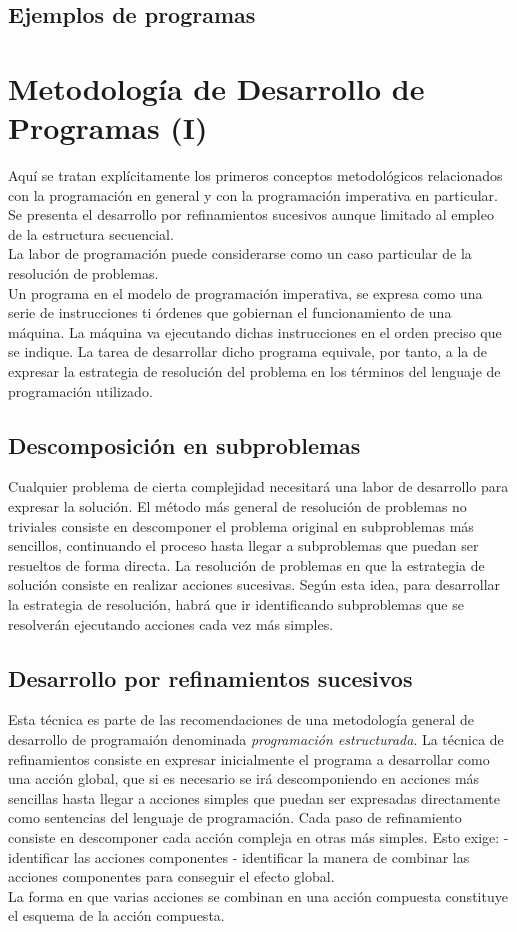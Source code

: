 \documentclass[11pt,a4paper]{article}
\begin{document}
 \subsection{Ejemplos de programas}
 
 
 \section{Metodología de Desarrollo de Programas (I)} 
 Aquí se tratan explícitamente los primeros conceptos metodológicos relacionados con la programación en general y con la programación imperativa en 
 particular. Se presenta el desarrollo por refinamientos sucesivos aunque limitado al empleo de la estructura secuencial.\\
 La labor de programación puede considerarse como un caso particular de la 
 resolución de problemas.\\
 Un programa en el modelo de programación imperativa, se expresa como una 
 serie de instrucciones ti órdenes que gobiernan el funcionamiento de una máquina. La máquina va ejecutando dichas instrucciones en el orden preciso que 
 se indique. La tarea de desarrollar dicho 
 programa equivale, por tanto, a la de expresar la estrategia de resolución del 
 problema en los términos del lenguaje de programación utilizado.
 \subsection{Descomposición en subproblemas}
 Cualquier problema de cierta complejidad necesitará una labor de desarrollo 
 para expresar la solución. El método más general de resolución de problemas 
 no triviales consiste en descomponer el problema original en subproblemas 
 más sencillos, continuando el proceso hasta llegar a subproblemas que puedan 
 ser resueltos de forma directa. La resolución de problemas en que la estrategia de 
 solución consiste en realizar acciones sucesivas. Según esta idea, para desarrollar la estrategia de resolución, habrá que ir 
 identificando subproblemas que se resolverán ejecutando acciones cada vez 
 más simples. 
 \subsection{Desarrollo por refinamientos sucesivos}
 Esta técnica 
 es parte de las recomendaciones de una metodología general de desarrollo de 
 programaión denominada \textit{programación estructurada}. La técnica de refinamientos consiste en expresar 
 inicialmente el programa a desarrollar como una acción global, que si es necesario se irá descomponiendo en acciones más sencillas hasta llegar a acciones 
 simples que puedan ser expresadas directamente como sentencias del lenguaje 
 de programación. Cada paso de refinamiento consiste en descomponer cada acción compleja en 
 otras más simples. Esto exige: - identificar las acciones componentes - identificar la manera de combinar las acciones componentes para conseguir el efecto global.\\
 La forma en que varias acciones se combinan en una acción compuesta constituye el esquema de la acción compuesta.
\end{document}

